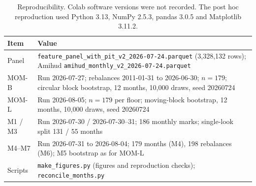 \documentclass[11pt]{article}
\begin{document}
\begin{table}[h]
\centering\footnotesize
\caption{Reproducibility. Colab software versions were not recorded. The post hoc
reproduction used Python 3.13, NumPy 2.5.3, pandas 3.0.5 and Matplotlib 3.11.2.}
\label{tab:repro}
\begin{tabularx}{\linewidth}{@{}l>{\raggedright\arraybackslash}X@{}}
\toprule
Item & Value \\
\midrule
Panel & \texttt{feature\_panel\_with\_pit\_v2\_2026-07-24.parquet} (3,328,132 rows); Amihud \texttt{amihud\_monthly\_v2\_2026-07-24.parquet} \\
MOM-B & Run 2026-07-27; rebalances 2011-01-31 to 2026-06-30; $n=179$; circular block bootstrap, 12 months, 10,000 draws, seed 20260724 \\
MOM-L & Run 2026-08-05; $n=179$ per floor; moving-block bootstrap, 12 months, 10,000 draws, seed 20260724 \\
M1 / M3 & Run 2026-07-30 / 2026-07-30--31; 186 monthly marks; single-look split 131 / 55 months \\
M4--M7 & Run 2026-07-31 to 2026-08-04; 179 months (M4), 198 rebalances (M6); M5 bootstrap as for MOM-L \\
Scripts & \texttt{make\_figures.py} (figures and reproduction checks); \texttt{reconcile\_months.py} \\
\bottomrule
\end{tabularx}
\end{table}

\aistatement




\end{document}
